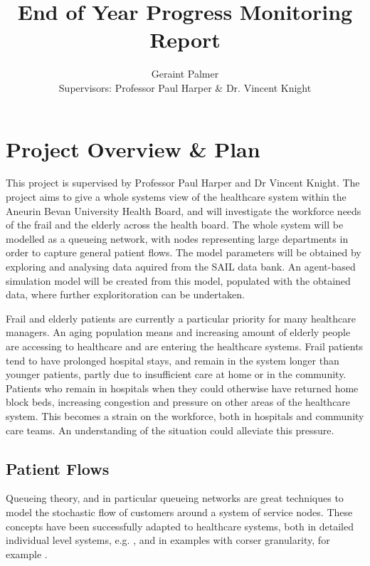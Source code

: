 \documentclass{article}
\title{End of Year Progress Monitoring Report}
\author{Geraint Palmer\\{\small Supervisors: Professor Paul Harper \& Dr. Vincent Knight}}
\date{}
\begin{document}
\onehalfspacing

\maketitle




\section{Project Overview \& Plan}

This project is supervised by Professor Paul Harper and Dr Vincent Knight.
The project aims to give a whole systems view of the healthcare system within the Aneurin Bevan University Health Board, and will investigate the workforce needs of the frail and the elderly across the health board.
The whole system will be modelled as a queueing network, with nodes representing large departments in order to capture general patient flows.
The model parameters will be obtained by exploring and analysing data aquired from the SAIL data bank.
An agent-based simulation model will be created from this model, populated with the obtained data, where further exploritoration can be undertaken.

Frail and elderly patients are currently a particular priority for many healthcare managers.
An aging population means and increasing amount of elderly people are accessing to healthcare and are entering the healthcare systems.
Frail patients tend to have prolonged hospital stays, and remain in the system longer than younger patients, partly due to insufficient care at home or in the community.
Patients who remain in hospitals when they could otherwise have returned home block beds, increasing congestion and pressure on other areas of the healthcare system.
This becomes a strain on the workforce, both in hospitals and community care teams.
An understanding of the situation could alleviate this pressure.

\subsection{Patient Flows}
Queueing theory, and in particular queueing networks are great techniques to model the stochastic flow of customers around a system of service nodes.
These concepts have been successfully adapted to healthcare systems, both in detailed individual level systems, e.g. \cite{albinetal90}, \cite{creemerslambrecht07} and in examples with corser granularity, for example \cite{koizumietal05}.
\end{document}
